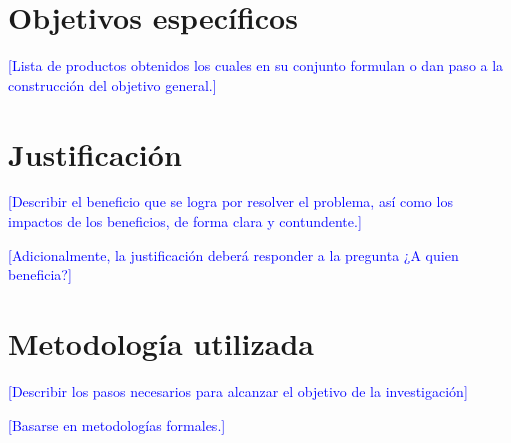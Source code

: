 \section{Objetivos específicos}

\textcolor{blue}{
[Lista de productos obtenidos los cuales en su conjunto formulan o dan paso a la 
construcción del objetivo general.]
}

\section{Justificación}

\textcolor{blue}{
[Describir el beneficio que se logra por resolver el problema, así como los 
impactos de los beneficios, de forma clara y contundente.]}\bigskip

\textcolor{blue}{
[Adicionalmente, la justificación deberá responder a la pregunta
¿A quien beneficia?]
}


\section{Metodología utilizada}

\textcolor{blue}{
[Describir los pasos necesarios para alcanzar el objetivo de la investigación]
}\bigskip

\textcolor{blue}{
[Basarse en metodologías formales.]
}
